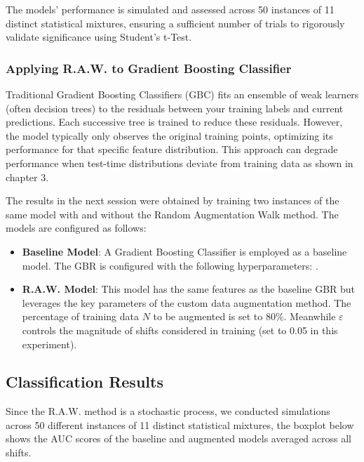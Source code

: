 The models' performance is simulated and assessed across 50 instances of 11 distinct statistical mixtures, ensuring a sufficient number of trials to rigorously validate significance using Student's t-Test.

\subsubsection{Applying R.A.W. to Gradient Boosting Classifier}

Traditional Gradient Boosting Classifiers (GBC) fits an ensemble of weak learners (often decision trees) to the residuals between your training labels and current predictions. Each successive tree is trained to reduce these residuals. However, the model typically only observes the original training points, optimizing its performance for that specific feature distribution. This approach can degrade performance when test-time distributions deviate from training data as shown in chapter 3. 

The results in the next session were obtained by training two instances of the same model with and without the Random Augmentation Walk method. The models are configured as follows:
\begin{itemize}
    \item \textbf{Baseline Model}: A Gradient Boosting Classifier is employed as a baseline model. The GBR is configured with the following hyperparameters: .
    \item \textbf{R.A.W. Model}: This model has the same features as the baseline GBR but leverages the key parameters of the custom data augmentation method. The percentage of training data $N$ to be augmented is set to 80\%. Meanwhile $\varepsilon$ controls the magnitude of shifts considered in training (set to 0.05 in this experiment).
\end{itemize}

\subsection{Classification Results}


Since the R.A.W. method is a stochastic process, we conducted simulations across 50 different instances of 11 distinct statistical mixtures, the boxplot below shows the AUC scores of the baseline and augmented models averaged across all shifts.

